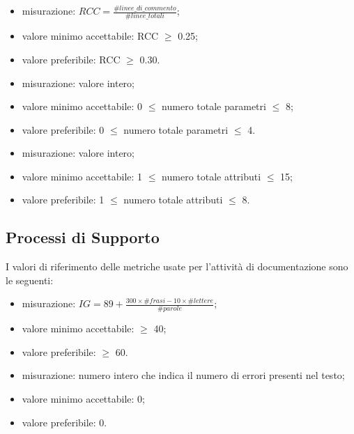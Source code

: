 			\begin{itemize}
				\item{misurazione: $RCC = \displaystyle\frac{\#linee\_di\_commento}{\#linee\_totali} $;}
				\item{valore minimo accettabile: RCC $\geq$ 0.25;}
				\item{valore preferibile: RCC $\geq$ 0.30.}
			\end{itemize}

			\begin{itemize}
				\item{misurazione: valore intero;}
				\item{valore minimo accettabile: 0 $\leq$ numero totale parametri $\leq$ 8;}
				\item{valore preferibile: 0 $\leq$ numero totale parametri $\leq$ 4.}
			\end{itemize}
			
			\begin{itemize}
				\item{misurazione: valore intero;}
				\item{valore minimo accettabile: 1 $\leq$ numero totale attributi $\leq$ 15;}
				\item{valore preferibile: 1 $\leq$ numero totale attributi $\leq$ 8.}
			\end{itemize}

\subsection{Processi di Supporto}

	I valori di riferimento delle metriche usate per l'attività di documentazione sono le seguenti:
	
			 \begin{itemize}
				\item{misurazione: $ IG=89+\frac{300 \times \#frasi -10\times \#lettere}{\#parole} $;}
				\item{valore minimo accettabile: $\geq$ 40;}
				\item{valore preferibile: $\geq$ 60.}
			\end{itemize}

			\begin{itemize}
				\item{misurazione: numero intero che indica il numero di errori presenti nel testo;}
				\item{valore minimo accettabile: 0;}
				\item{valore preferibile: 0.}
			\end{itemize}
		
